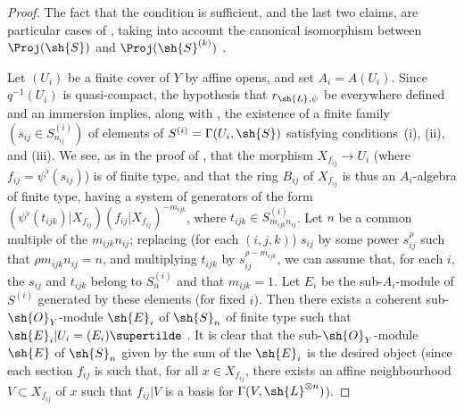 \begin{proof}
The fact that the condition is sufficient, and the last two claims, are particular cases of , taking into account the canonical isomorphism between $\Proj(\sh{S})$ and $\Proj(\sh{S}^{(k)})$ .

Let $(U_i)$ be a finite cover of $Y$ by affine opens, and set $A_i=A(U_i)$.
Since $q^{-1}(U_i)$ is quasi-compact, the hypothesis that $r_{\sh{L},\psi}$ be everywhere defined and an immersion implies, along with , the existence of a finite family $(s_{ij}\in S_{n_{ij}}^{(i)})$ of elements of $S^{(i)}=\Gamma(U_i,\sh{S})$ satisfying conditions~(i), (ii), and (iii).
We see, as in the proof of , that the morphism $X_{f_{ij}}\to U_i$ (where $f_{ij}=\psi^\flat(s_{ij})$) is of finite type, and that the ring $B_{ij}$ of $X_{f_{ij}}$ is thus an $A_i$-algebra of finite type, having a system of generators of the form $(\psi^\flat(t_{ijk})|X_{f_{ij}})(f_{ij}|X_{f_{ij}})^{-m_{ijk}}$, where $t_{ijk}\in S_{m_{ijk}n_{ij}}^{(i)}$.
Let $n$ be a common multiple of the $m_{ijk}n_{ij}$;
replacing (for each $(i,j,k)$) $s_{ij}$ by some power $s_{ij}^\rho$ such that $\rho m_{ijk}n_{ij}=n$, and multiplying $t_{ijk}$ by $s_{ij}^{\rho-m_{ijk}}$, we can assume that, for each $i$, the $s_{ij}$ and $t_{ijk}$ belong to $S_n^{(i)}$ and that $m_{ijk}=1$.
Let $E_i$ be the sub-$A_i$-module of $S^{(i)}$ generated by these elements (for fixed $i$).
Then there exists a coherent sub-$\sh{O}_Y$-module $\sh{E}_i$ of $\sh{S}_n$ of finite type such that $\sh{E}_i|U_i=(E_i)\supertilde$ .
It is clear that the sub-$\sh{O}_Y$-module $\sh{E}$ of $\sh{S}_n$ given by the sum of the $\sh{E}_i$ is the desired object (since each section $f_{ij}$ is such that, for all $x\in X_{f_{ij}}$, there exists an affine neighbourhood $V\subset X_{f_{ij}}$ of $x$ such that $f_{ij}|V$ is a basis for $\Gamma(V,\sh{L}^{\otimes n})$).
\end{proof}
